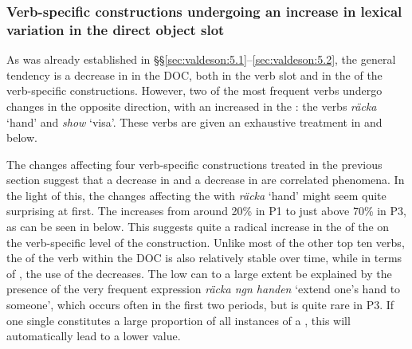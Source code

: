 \documentclass[output=paper]{langscibook}
\begin{document}
\subsubsection{Verb-specific constructions undergoing an increase in lexical variation in the direct object slot}\label{sec:valdeson:5.3.2}


As was already established in §§\ref{sec:valdeson:5.1}--\ref{sec:valdeson:5.2}, the general tendency is a decrease in  in the DOC, both in the verb slot and in the  of the verb-specific constructions. However, two of the most frequent verbs undergo changes in the opposite direction, with an increased  in the : the verbs \textit{räcka} ‘hand’ and \textit{show} ‘visa’. These verbs are given an exhaustive treatment in  and  below.



\label{sec:valdeson:5.3.2.1}
The changes affecting four verb-specific constructions treated in the previous section suggest that a decrease in  and a decrease in  are correlated phenomena. In the light of this, the changes affecting the  with \textit{räcka} ‘hand’ might seem quite surprising at first. The  increases from around 20\% in P1 to just above 70\% in P3, as can be seen in  below. This suggests quite a radical increase in the  of the  on the verb-specific level of the construction. Unlike most of the other top ten verbs, the  of the verb within the DOC is also relatively stable over time, while in terms of , the use of the  decreases. The low  can to a large extent be explained by the presence of the very frequent expression \textit{räcka ngn handen} ‘extend one's hand to someone’, which occurs often in the first two periods, but is quite rare in P3. If one single  constitutes a large proportion of all instances of a , this will automatically lead to a lower  value.
\end{document}
